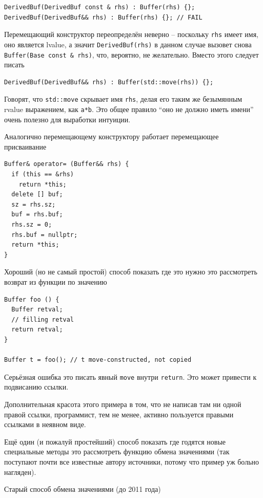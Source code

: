 \documentclass[a4paper,12pt,oneside]{book}
\begin{document}
\begin{lstlisting}
DerivedBuf(DerivedBuf const & rhs) : Buffer(rhs) {};
DerivedBuf(DerivedBuf&& rhs) : Buffer(rhs) {}; // FAIL
\end{lstlisting}

Перемещающий конструктор переопределён неверно -- поскольку \lstinline!rhs! имеет имя, оно является lvalue, а значит \lstinline!DerivedBuf(rhs)! в данном случае вызовет снова \lstinline!Buffer(Base const & rhs)!, что, вероятно, не желательно. Вместо этого следует писать

\begin{lstlisting}
DerivedBuf(DerivedBuf&& rhs) : Buffer(std::move(rhs)) {};
\end{lstlisting}

Говорят, что \lstinline!std::move! скрывает имя \lstinline!rhs!, делая его таким же безымянным rvalue выражением, как \lstinline!a*b!. Это общее правило ``оно не должно иметь имени'' очень полезно для выработки интуиции.

Аналогично перемещающему конструктору работает перемещающее присваивание

\begin{lstlisting}
Buffer& operator= (Buffer&& rhs) {
  if (this == &rhs) 
    return *this;
  delete [] buf;
  sz = rhs.sz;
  buf = rhs.buf;
  rhs.sz = 0;
  rhs.buf = nullptr;
  return *this;
} 
\end{lstlisting}

Хороший (но не самый простой) способ показать где это нужно это рассмотреть возврат из функции по значению

\begin{lstlisting}
Buffer foo () {
  Buffer retval;
  // filling retval
  return retval;
}

Buffer t = foo(); // t move-constructed, not copied
\end{lstlisting}

Серьёзная ошибка это писать явный \lstinline!move! внутри \lstinline!return!. Это может привести к подвисанию ссылки. 

Дополнительная красота этого примера в том, что не написав там ни одной правой ссылки, программист, тем не менее, активно пользуется правыми ссылками в неявном виде.

Ещё один (и пожалуй простейший) способ показать где годятся новые специальные методы это рассмотреть функцию обмена значениями (так поступают почти все известные автору источники, потому что пример уж больно нагляден).

Старый способ обмена значениями (до 2011 года)
\end{document}

